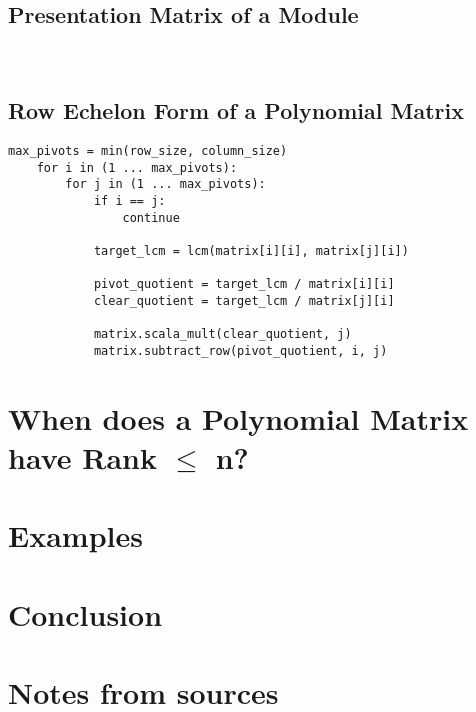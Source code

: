\documentclass{amsart}
\theoremstyle{definition}
\theoremstyle{remark}
\numberwithin{equation}{section}
\begin{document}

\subsection{Presentation Matrix of a Module}

\leavevmode \\


\subsection{Row Echelon Form of a Polynomial Matrix}

\begin{lstlisting}[caption=Computing the Row Echelon Form of a Polynomial Matrix]
    max_pivots = min(row_size, column_size)
    for i in (1 ... max_pivots):
        for j in (1 ... max_pivots):
            if i == j:
                continue

            target_lcm = lcm(matrix[i][i], matrix[j][i])
    
            pivot_quotient = target_lcm / matrix[i][i]
            clear_quotient = target_lcm / matrix[j][i]
    
            matrix.scala_mult(clear_quotient, j)
            matrix.subtract_row(pivot_quotient, i, j)
\end{lstlisting}

\section{When does a Polynomial Matrix have Rank $\leq$ n?}
\label{sec:polynomial-matrix}

\section{Examples}

\section{Conclusion}

\newpage

\section*{Notes from sources}
\label{sec:notes-from-sources}
\end{document}
